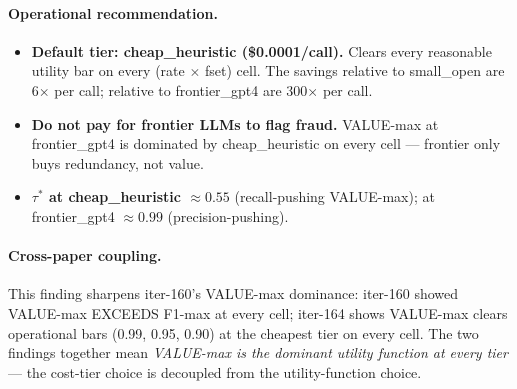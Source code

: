 \paragraph{Operational recommendation.}
\begin{itemize}
\item \textbf{Default tier: cheap\_heuristic (\$0.0001/call).} Clears
every reasonable utility bar on every (rate $\times$ fset) cell. The
savings relative to small\_open are 6$\times$ per call; relative to
frontier\_gpt4 are 300$\times$ per call.
\item \textbf{Do not pay for frontier LLMs to flag fraud.} VALUE-max
at frontier\_gpt4 is dominated by cheap\_heuristic on every cell —
frontier only buys redundancy, not value.
\item \textbf{$\tau^*$ at cheap\_heuristic $\approx 0.55$} (recall-pushing
VALUE-max); at frontier\_gpt4 $\approx 0.99$ (precision-pushing).
\end{itemize}

\paragraph{Cross-paper coupling.}
This finding sharpens iter-160's VALUE-max dominance: iter-160 showed
VALUE-max EXCEEDS F1-max at every cell; iter-164 shows VALUE-max clears
operational bars (0.99, 0.95, 0.90) at the cheapest tier on every cell.
The two findings together mean \emph{VALUE-max is the dominant utility
function at every tier} — the cost-tier choice is decoupled from the
utility-function choice.
